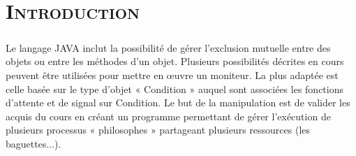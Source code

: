 \chapter*{\textsc{Introduction}}

	\paragraph{} Le langage JAVA inclut la possibilité de gérer l’exclusion mutuelle entre des objets ou entre les méthodes d’un objet. Plusieurs possibilités décrites en cours peuvent être utilisées pour mettre en œuvre un moniteur. La plus adaptée est celle basée sur le type d’objet « Condition » auquel sont associées les fonctions d’attente et de signal sur Condition. Le but de la manipulation est de valider les acquis du cours en créant un programme permettant de gérer l’exécution de plusieurs processus « philosophes » partageant plusieurs ressources (les baguettes...).
	

